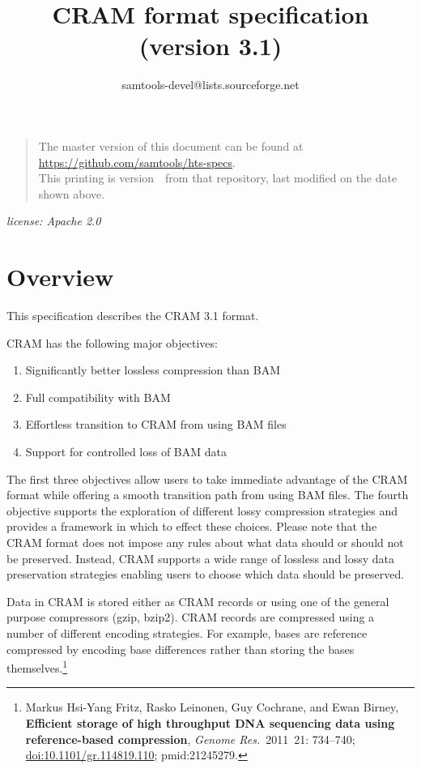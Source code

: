 \documentclass[a4paper]{article}
\begin{document}

\title{CRAM format specification (version 3.1)}
\author{samtools-devel@lists.sourceforge.net}
\date{\headdate}
\maketitle


\begin{quote}\small
The master version of this document can be found at
\url{https://github.com/samtools/hts-specs}.\\
This printing is version~\commitdesc\ from that repository,
last modified on the date shown above.
\end{quote}

\begin{center}
\textit{license: Apache 2.0}
\end{center}
\vspace*{1em}

\section{\textbf{Overview}}

This specification describes the CRAM 3.1 format. 

CRAM has the following major objectives:

\begin{enumerate}
\item Significantly better lossless compression than BAM

\item Full compatibility with BAM

\item Effortless transition to CRAM from using BAM files

\item Support for controlled loss of BAM data
\end{enumerate}

The first three objectives allow users to take immediate advantage of the CRAM 
format while offering a smooth transition path from using BAM files. The fourth 
objective supports the exploration of different lossy compression strategies and 
provides a framework in which to effect these choices. Please note that the CRAM 
format does not impose any rules about what data should or should not be preserved. 
Instead, CRAM supports a wide range of lossless and lossy data preservation strategies 
enabling users to choose which data should be preserved.

Data in CRAM is stored either as CRAM records or using one of the general purpose 
compressors (gzip, bzip2). CRAM records are compressed using a number of different 
encoding strategies. For example, bases are reference compressed by encoding base
differences rather than storing the bases themselves.\footnote{Markus Hsi-Yang Fritz,
Rasko Leinonen, Guy Cochrane, and Ewan Birney,
\textbf{Efficient storage of high throughput DNA sequencing data using reference-based compression},
{\sl Genome Res.}~2011~21: 734--740;
\href{http://dx.doi.org/doi:10.1101/gr.114819.110}{doi:10.1101/gr.114819.110};
{\sc pmid:}21245279.}
\end{document}
